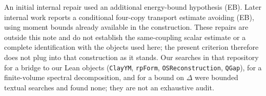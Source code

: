 \documentclass[11pt,a4paper]{article}
\theoremstyle{plain}
\theoremstyle{definition}
\theoremstyle{remark}
\numberwithin{equation}{section}
\begin{document}
An initial internal repair used an additional energy-bound hypothesis (EB). Later internal work reports a conditional four-copy transport estimate avoiding (EB), using moment bounds already available in the construction. These repairs are outside this note and do not establish the same-coupling scalar estimate or a complete identification with the objects used here; the present criterion therefore does not plug into that construction as it stands. Our searches in that repository for a bridge to our Lean objects (\texttt{ClayYM}, \texttt{rpForm}, \texttt{OSReconstruction}, \texttt{QGap}),
for a finite-volume spectral decomposition, and for a bound on $\Delta$ were bounded textual searches and found none; they are not an exhaustive audit.
\endgroup

\end{document}
